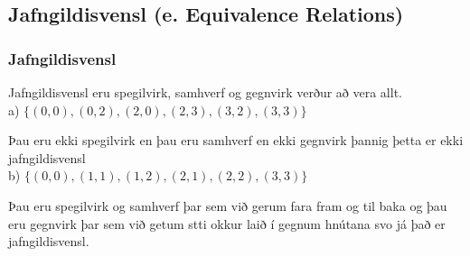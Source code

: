 \subsection{Jafngildisvensl (e. Equivalence Relations)}
\subsubsection{Jafngildisvensl}
Jafngildisvensl eru spegilvirk, samhverf og gegnvirk verður að vera allt.\\

a) $\{(0,0), (0,2),(2,0),(2,3),(3,2),(3,3)\}$

Þau eru ekki spegilvirk en þau eru samhverf en ekki gegnvirk þannig þetta er \hspace*{1em} ekki jafngildisvensl\\

b) $\{(0,0), (1,1),(1,2),(2,1),(2,2),(3,3)\}$

Þau eru spegilvirk og samhverf þar sem við gerum fara fram og til baka og þau \hspace*{1em} eru gegnvirk þar sem við getum stti okkur laið í gegnum hnútana svo já það er \hspace*{1em} jafngildisvensl.
\newpage